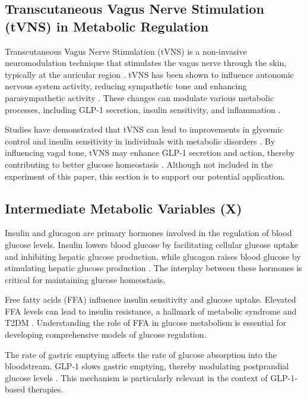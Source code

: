 \documentclass[9pt,shortpaper,twoside,web]{ieeecolor}
\begin{document}
\subsection{Transcutaneous Vagus Nerve Stimulation (tVNS) in Metabolic Regulation}

Transcutaneous Vagus Nerve Stimulation (tVNS) is a non-invasive neuromodulation technique that stimulates the vagus nerve through the skin, typically at the auricular region \cite{jinic2024tvns}. tVNS has been shown to influence autonomic nervous system activity, reducing sympathetic tone and enhancing parasympathetic activity \cite{gan2024tvns}. These changes can modulate various metabolic processes, including GLP-1 secretion, insulin sensitivity, and inflammation \cite{harada2024gut}.

Studies have demonstrated that tVNS can lead to improvements in glycemic control and insulin sensitivity in individuals with metabolic disorders \cite{wang2024supaglutide}. By influencing vagal tone, tVNS may enhance GLP-1 secretion and action, thereby contributing to better glucose homeostasis \cite{kaye2024glp1}. Although not included in the experiment of this paper, this section is to support our potential application.


\subsection{Intermediate Metabolic Variables (X)}

Insulin and glucagon are primary hormones involved in the regulation of blood glucose levels. Insulin lowers blood glucose by facilitating cellular glucose uptake and inhibiting hepatic glucose production, while glucagon raises blood glucose by stimulating hepatic glucose production \cite{asteria2024disruptors}. The interplay between these hormones is critical for maintaining glucose homeostasis.

Free fatty acids (FFA) influence insulin sensitivity and glucose uptake. Elevated FFA levels can lead to insulin resistance, a hallmark of metabolic syndrome and T2DM \cite{xiang2024dualagonists}. Understanding the role of FFA in glucose metabolism is essential for developing comprehensive models of glucose regulation.

The rate of gastric emptying affects the rate of glucose absorption into the bloodstream. GLP-1 slows gastric emptying, thereby modulating postprandial glucose levels \cite{wang2024supaglutide}. This mechanism is particularly relevant in the context of GLP-1-based therapies.
\end{document}
